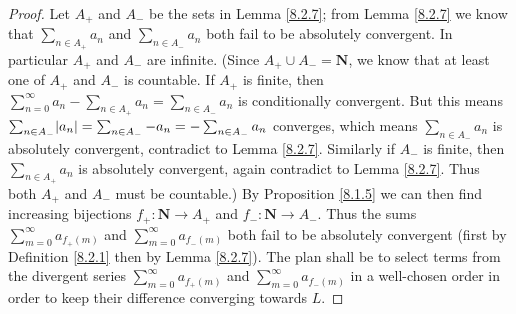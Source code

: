 \begin{proof}
    Let \(A_+\) and \(A_-\) be the sets in Lemma \ref{8.2.7};
    from Lemma \ref{8.2.7} we know that \(\sum_{n \in A_+} a_n\) and \(\sum_{n \in A_-} a_n\) both fail to be absolutely convergent.
    In particular \(A_+\) and \(A_-\) are infinite.
    (Since \(A_+ \cup A_- = \mathbf{N}\), we know that at least one of \(A_+\) and \(A_-\) is countable.
    If \(A_+\) is finite, then \(\sum_{n = 0}^\infty a_n - \sum_{n \in A_+} a_n = \sum_{n \in A_-} a_n\) is conditionally convergent.
    But this means \(\sum_{n \in A_-} \abs*{a_n} = \sum_{n \in A_-} -a_n = -\sum_{n \in A_-} a_n\) converges, which means \(\sum_{n \in A_-} a_n\) is absolutely convergent, contradict to Lemma \ref{8.2.7}.
    Similarly if \(A_-\) is finite, then \(\sum_{n \in A_+} a_n\) is absolutely convergent, again contradict to Lemma \ref{8.2.7}.
    Thus both \(A_+\) and \(A_-\) must be countable.)
    By Proposition \ref{8.1.5} we can then find increasing bijections \(f_+ : \mathbf{N} \to A_+\) and \(f_- : \mathbf{N} \to A_-\).
    Thus the sums \(\sum_{m = 0}^\infty a_{f_+(m)}\) and \(\sum_{m = 0}^\infty a_{f_-(m)}\) both fail to be absolutely convergent (first by Definition \ref{8.2.1} then by Lemma \ref{8.2.7}).
    The plan shall be to select terms from the divergent series \(\sum_{m = 0}^\infty a_{f_+(m)}\) and \(\sum_{m = 0}^\infty a_{f_-(m)}\) in a well-chosen order in order to keep their difference converging towards \(L\).


\end{proof}
